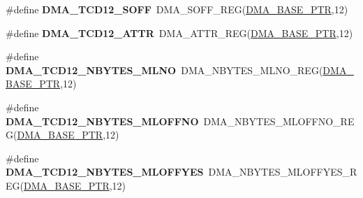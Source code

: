 \begin{DoxyCompactItemize}
\item 
\hypertarget{group___d_m_a___register___accessor___macros_ga011e8c68fffc17fe021a2642a0576241}{}\#define {\bfseries D\+M\+A\+\_\+\+T\+C\+D12\+\_\+\+S\+O\+F\+F}~D\+M\+A\+\_\+\+S\+O\+F\+F\+\_\+\+R\+E\+G(\hyperlink{group___d_m_a___peripheral_ga6997fbc1b1973e9f27170217a3bd6f22}{D\+M\+A\+\_\+\+B\+A\+S\+E\+\_\+\+P\+T\+R},12)\label{group___d_m_a___register___accessor___macros_ga011e8c68fffc17fe021a2642a0576241}

\item 
\hypertarget{group___d_m_a___register___accessor___macros_ga2a74898e8e99ad24eb0d62aa541d809b}{}\#define {\bfseries D\+M\+A\+\_\+\+T\+C\+D12\+\_\+\+A\+T\+T\+R}~D\+M\+A\+\_\+\+A\+T\+T\+R\+\_\+\+R\+E\+G(\hyperlink{group___d_m_a___peripheral_ga6997fbc1b1973e9f27170217a3bd6f22}{D\+M\+A\+\_\+\+B\+A\+S\+E\+\_\+\+P\+T\+R},12)\label{group___d_m_a___register___accessor___macros_ga2a74898e8e99ad24eb0d62aa541d809b}

\item 
\hypertarget{group___d_m_a___register___accessor___macros_ga693b26ec7160da096f6632d935bbeb63}{}\#define {\bfseries D\+M\+A\+\_\+\+T\+C\+D12\+\_\+\+N\+B\+Y\+T\+E\+S\+\_\+\+M\+L\+N\+O}~D\+M\+A\+\_\+\+N\+B\+Y\+T\+E\+S\+\_\+\+M\+L\+N\+O\+\_\+\+R\+E\+G(\hyperlink{group___d_m_a___peripheral_ga6997fbc1b1973e9f27170217a3bd6f22}{D\+M\+A\+\_\+\+B\+A\+S\+E\+\_\+\+P\+T\+R},12)\label{group___d_m_a___register___accessor___macros_ga693b26ec7160da096f6632d935bbeb63}

\item 
\hypertarget{group___d_m_a___register___accessor___macros_gab1a3b0c41ce17352024cb6352bbca988}{}\#define {\bfseries D\+M\+A\+\_\+\+T\+C\+D12\+\_\+\+N\+B\+Y\+T\+E\+S\+\_\+\+M\+L\+O\+F\+F\+N\+O}~D\+M\+A\+\_\+\+N\+B\+Y\+T\+E\+S\+\_\+\+M\+L\+O\+F\+F\+N\+O\+\_\+\+R\+E\+G(\hyperlink{group___d_m_a___peripheral_ga6997fbc1b1973e9f27170217a3bd6f22}{D\+M\+A\+\_\+\+B\+A\+S\+E\+\_\+\+P\+T\+R},12)\label{group___d_m_a___register___accessor___macros_gab1a3b0c41ce17352024cb6352bbca988}

\item 
\hypertarget{group___d_m_a___register___accessor___macros_gae26b659783dba451d178c3834746ebab}{}\#define {\bfseries D\+M\+A\+\_\+\+T\+C\+D12\+\_\+\+N\+B\+Y\+T\+E\+S\+\_\+\+M\+L\+O\+F\+F\+Y\+E\+S}~D\+M\+A\+\_\+\+N\+B\+Y\+T\+E\+S\+\_\+\+M\+L\+O\+F\+F\+Y\+E\+S\+\_\+\+R\+E\+G(\hyperlink{group___d_m_a___peripheral_ga6997fbc1b1973e9f27170217a3bd6f22}{D\+M\+A\+\_\+\+B\+A\+S\+E\+\_\+\+P\+T\+R},12)\label{group___d_m_a___register___accessor___macros_gae26b659783dba451d178c3834746ebab}


\end{DoxyCompactItemize}
